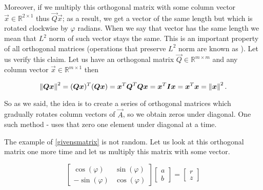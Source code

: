 Moreover, if we multiply this orthogonal matrix with some column vector $\vec{x} \in \mathbb{R}^{2 \times 1}$ thus $\vec{Q}\vec{x}$; as a result, we get a vector of the same length but which is rotated clockwise by  $\varphi$ radians. When we say that vector has the same length we mean that $L^2$ norm of such vector stays the same. This is an important property of all orthogonal matrices (operations that preserve $L^2$ norm are known as ). Let us verify this claim. Let us have an orthogonal matrix $\vec{Q} \in \mathbb{R}^{m \times m}$ and any column vector $\vec{x} \in  \mathbb{R}^{m \times 1}$ then

\begin{equation}
    \left\lVert\boldsymbol{Q}\boldsymbol{x}\right\rVert^2 = (\boldsymbol{Q}\boldsymbol{x})^T (\boldsymbol{Q}\boldsymbol{x}) = \boldsymbol{x}^T\boldsymbol{Q}^T\boldsymbol{Q}\boldsymbol{x} = 
    \boldsymbol{x}^T\boldsymbol{I}\boldsymbol{x} = \boldsymbol{x}^T\boldsymbol{x} = \left\lVert\boldsymbol{x}\right\rVert^2.
\end{equation}

So as we said,  the idea is to create a series of orthogonal matrices which gradually rotates column vectors of $\vec{A}$, so we obtain zeros under diagonal. One such method -  uses  that zero one element under diagonal at a time.

The example of \eqref{givensmatrix} is not random. Let us look at this orthogonal matrix one more time and let us multiply this matrix with some vector.

\begin{equation}
    \begin{bmatrix} 
        \cos(\varphi) & \sin(\varphi) \\
        - \sin(\varphi) & \cos(\varphi)
        \end{bmatrix}
        \begin{bmatrix} 
            a \\
            b
            \end{bmatrix} = 
            \begin{bmatrix} 
                r \\
                z
                \end{bmatrix}
\end{equation}

